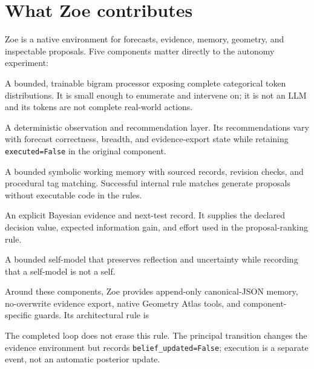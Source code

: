 \documentclass[11pt,a4paper]{article}
\begin{document}
\section{What Zoe contributes}
Zoe is a native environment for forecasts, evidence, memory, geometry, and inspectable proposals. Five components matter directly to the autonomy experiment:
\begin{description}[style=nextline]
  \item[Cog.] A bounded, trainable bigram processor exposing complete categorical token distributions. It is small enough to enumerate and intervene on; it is not an LLM and its tokens are not complete real-world actions.
  \item[BRAIN.] A deterministic observation and recommendation layer. Its recommendations vary with forecast correctness, breadth, and evidence-export state while retaining \texttt{executed=False} in the original component.
  \item[Cognitive Field.] A bounded symbolic working memory with sourced records, revision checks, and procedural tag matching. Successful internal rule matches generate proposals without executable code in the rules.
  \item[Field Notebook.] An explicit Bayesian evidence and next-test record. It supplies the declared decision value, expected information gain, and effort used in the proposal-ranking rule.
  \item[Presence.] A bounded self-model that preserves reflection and uncertainty while recording that a self-model is not a self.
\end{description}
Around these components, Zoe provides append-only canonical-JSON memory, no-overwrite evidence export, native Geometry Atlas tools, and component-specific guards. Its architectural rule is
\begin{center}
\end{center}
The completed loop does not erase this rule. The principal transition changes the evidence environment but records \texttt{belief\_updated=False}; execution is a separate event, not an automatic posterior update.
\end{document}
